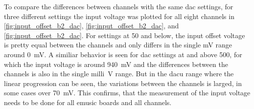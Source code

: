 To compare the differences between channels with the same \ac{dac} settings, for three different settings the input voltage was plotted for all eight channels in \autoref{fig:input_offset_b2_dac}, \autoref{fig:input_offset_b2_dac}, and \autoref{fig:input_offset_b2_dac}.
For settings at \SI{50}{\dacu} and below, the input offset voltage is pretty equal between the channels and only differs in the single \si{\milli\volt} range around \SI{0}{\milli\volt}.
A similiar behavior is seen for \ac{dac} settings at and above \SI{500}{\dacu}, for which the input voltage is around \SI{940}{\milli\volt} and the differences between the channels is also in the single \si{milli\volt} range.
But in the \si{dacu} range where the linear progression can be seen, the variations between the channels is larged, in some cases over \SI{70}{\milli\volt}.
This confirms, that the measurement of the input voltage needs to be done for all \ac{emusic} boards and all channels.
